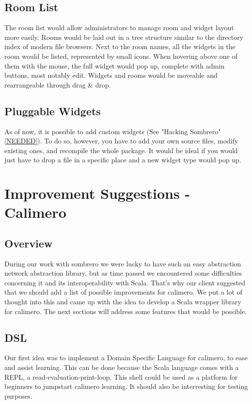 \subsection{Room List}
The room list would allow administrators to manage room and widget layout more easily. Rooms would be laid out in a tree structure similar to the directory index of modern file browsers. Next to the room names, all the widgets in the room would be listed, represented by small icons. When hovering above one of them with the mouse, the full widget would pop up, complete with admin buttons, most notably edit. Widgets and rooms would be moveable and rearrangeable through drag \& drop.

\subsection{Pluggable Widgets}
As of now, it is possible to add custom widgets (See "Hacking Sombrero" \ref{NEEDED}). To do so, however, you have to add your own source files, modify existing ones, and recompile the whole package. It would be ideal if you would just have to drop a file in a specific place and a new widget type would pop up.

\section{Improvement Suggestions - Calimero}
\subsection{Overview}
During our work with sombrero we were lucky to have such an easy abstraction network abstraction library, but as time passed we encountered some difficulties concerning it and its interoperability with Scala. That's why our client suggested that we should add a list of possible improvements for calimero. We put a lot of thought into this and came up with the idea to develop a Scala wrapper library for calimero. The next sections will address some features that would be possible.

\subsection{DSL}
Our first idea was to implement a Domain Specific Language for calimero, to ease and assist learning. This can be done because the Scala language comes with a REPL, a read-evaluation-print-loop. This shell could be used as a platform for beginners to jumpstart calimero learning. It should also be interresting for testing purposes.

